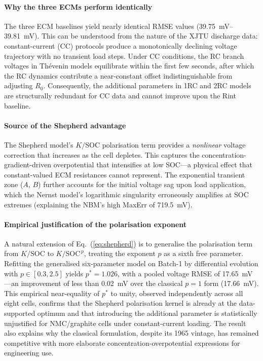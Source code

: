 \documentclass[5p,times,number]{elsarticle}
\newcommand{\eqnref}[1]{\hyperref[#1]{\textup{Eq.~(\ref*{#1})}}}
\def\eqnref#1{Eq.~(\ref{#1})}
\begin{document}
\paragraph{Why the three ECMs perform identically}
The three ECM baselines yield nearly identical RMSE values (\SIrange{39.75}{39.81}{\milli\volt}).
This can be understood from the nature of the XJTU discharge data: constant-current (CC) protocols produce a monotonically declining voltage trajectory with no transient load steps.
Under CC conditions, the RC branch voltages in Th\'{e}venin models equilibrate within the first few seconds, after which the RC dynamics contribute a near-constant offset indistinguishable from adjusting $R_0$.
Consequently, the additional parameters in 1RC and 2RC models are structurally redundant for CC data and cannot improve upon the Rint baseline.

\paragraph{Source of the Shepherd advantage}
The Shepherd model's $K/\mathrm{SOC}$ polarisation term provides a \emph{nonlinear} voltage correction that increases as the cell depletes.
This captures the concentration-gradient-driven overpotential that intensifies at low SOC---a physical effect that constant-valued ECM resistances cannot represent.
The exponential transient zone ($A$, $B$) further accounts for the initial voltage sag upon load application, which the Nernst model's logarithmic singularity erroneously amplifies at SOC extremes (explaining the NBM's high MaxErr of \SI{719.5}{\milli\volt}).

\paragraph{Empirical justification of the polarisation exponent}
A natural extension of \eqnref{eq:shepherd} is to generalise the polarisation term from $K/\mathrm{SOC}$ to $K/\mathrm{SOC}^{\,p}$, treating the exponent $p$ as a sixth free parameter. Refitting the generalised six-parameter model on Batch-1 by differential evolution with $p \in [0.3, 2.5]$ yields $p^{*} = 1.026$, with a pooled voltage RMSE of \SI{17.65}{\milli\volt}---an improvement of less than \SI{0.02}{\milli\volt} over the classical $p = 1$ form (\SI{17.66}{\milli\volt}). This empirical near-equality of $p^{*}$ to unity, observed independently across all eight cells, confirms that the Shepherd polarisation kernel is already at the data-supported optimum and that introducing the additional parameter is statistically unjustified for NMC/graphite cells under constant-current loading. The result also explains why the classical formulation, despite its 1965 vintage, has remained competitive with more elaborate concentration-overpotential expressions for engineering use.
\end{document}
